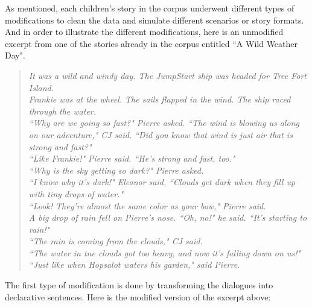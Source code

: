As mentioned, each children's story in the corpus underwent different types of modifications to clean the data and simulate different scenarios or story formats. And in order to illustrate the different modifications, here is an unmodified excerpt from one of the stories already in the corpus entitled ``A Wild Weather Day".

\begin{verse}
\itshape
It was a wild and windy day. The JumpStart ship was headed for Tree Fort Island. \\
Frankie was at the wheel. The sails flapped in the wind. The ship raced through the water. \\
``Why are we going so fast?" Pierre asked. ``The wind is blowing us along on our adventure," CJ said. ``Did you know that wind is just air that is strong and fast?" \\
``Like Frankie!" Pierre said. ``He's strong and fast, too." \\
``Why is the sky getting so dark?" Pierre asked. \\
``I know why it's dark!" Eleanor said. ``Clouds get dark when they fill up with tiny drops of water." \\
``Look! They're almost the same color as your bow," Pierre said. \\
A big drop of rain fell on Pierre's nose. ``Oh, no!" he said. ``It's starting to rain!" \\
``The rain is coming from the clouds," CJ said. \\
``The water in tne clouds got too heavy, and now it's falling down on us!" \\
``Just like when Hopsalot waters his garden," said Pierre. \\
\end{verse}

The first type of modification is done by transforming the dialogues into declarative sentences. Here is the modified version of the excerpt above:

